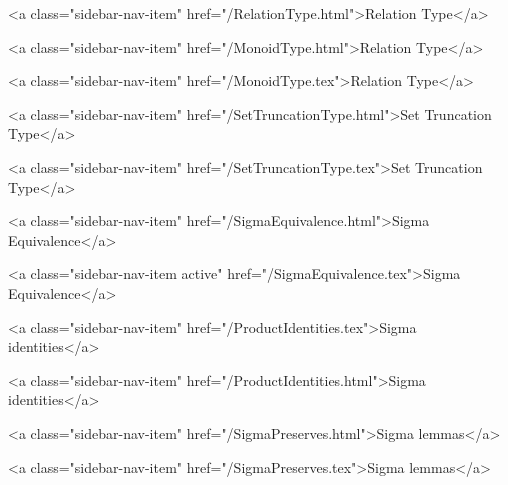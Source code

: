       
    
      
        
          <a class="sidebar-nav-item" href="/RelationType.html">Relation Type</a>
        
      
    
      
        
          <a class="sidebar-nav-item" href="/MonoidType.html">Relation Type</a>
        
      
    
      
        
          <a class="sidebar-nav-item" href="/MonoidType.tex">Relation Type</a>
        
      
    
      
        
          <a class="sidebar-nav-item" href="/SetTruncationType.html">Set Truncation Type</a>
        
      
    
      
        
          <a class="sidebar-nav-item" href="/SetTruncationType.tex">Set Truncation Type</a>
        
      
    
      
        
          <a class="sidebar-nav-item" href="/SigmaEquivalence.html">Sigma Equivalence</a>
        
      
    
      
        
          <a class="sidebar-nav-item active" href="/SigmaEquivalence.tex">Sigma Equivalence</a>
        
      
    
      
        
          <a class="sidebar-nav-item" href="/ProductIdentities.tex">Sigma identities</a>
        
      
    
      
        
          <a class="sidebar-nav-item" href="/ProductIdentities.html">Sigma identities</a>
        
      
    
      
        
          <a class="sidebar-nav-item" href="/SigmaPreserves.html">Sigma lemmas</a>
        
      
    
      
        
          <a class="sidebar-nav-item" href="/SigmaPreserves.tex">Sigma lemmas</a>
        
